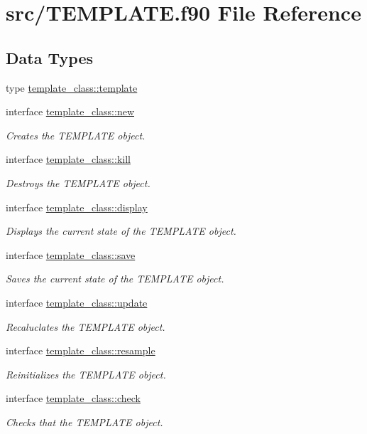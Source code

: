 \hypertarget{_t_e_m_p_l_a_t_e_8f90}{}\section{src/\+T\+E\+M\+P\+L\+A\+TE.f90 File Reference}
\label{_t_e_m_p_l_a_t_e_8f90}
\subsection*{Data Types}
\begin{DoxyCompactItemize}
\item 
type \hyperlink{structtemplate__class_1_1template}{template\+\_\+class\+::template}
\item 
interface \hyperlink{interfacetemplate__class_1_1new}{template\+\_\+class\+::new}
\begin{DoxyCompactList}\small\item\em Creates the T\+E\+M\+P\+L\+A\+TE object. \end{DoxyCompactList}\item 
interface \hyperlink{interfacetemplate__class_1_1kill}{template\+\_\+class\+::kill}
\begin{DoxyCompactList}\small\item\em Destroys the T\+E\+M\+P\+L\+A\+TE object. \end{DoxyCompactList}\item 
interface \hyperlink{interfacetemplate__class_1_1display}{template\+\_\+class\+::display}
\begin{DoxyCompactList}\small\item\em Displays the current state of the T\+E\+M\+P\+L\+A\+TE object. \end{DoxyCompactList}\item 
interface \hyperlink{interfacetemplate__class_1_1save}{template\+\_\+class\+::save}
\begin{DoxyCompactList}\small\item\em Saves the current state of the T\+E\+M\+P\+L\+A\+TE object. \end{DoxyCompactList}\item 
interface \hyperlink{interfacetemplate__class_1_1update}{template\+\_\+class\+::update}
\begin{DoxyCompactList}\small\item\em Recaluclates the T\+E\+M\+P\+L\+A\+TE object. \end{DoxyCompactList}\item 
interface \hyperlink{interfacetemplate__class_1_1resample}{template\+\_\+class\+::resample}
\begin{DoxyCompactList}\small\item\em Reinitializes the T\+E\+M\+P\+L\+A\+TE object. \end{DoxyCompactList}\item 
interface \hyperlink{interfacetemplate__class_1_1check}{template\+\_\+class\+::check}
\begin{DoxyCompactList}\small\item\em Checks that the T\+E\+M\+P\+L\+A\+TE object. \end{DoxyCompactList}\end{DoxyCompactItemize}
